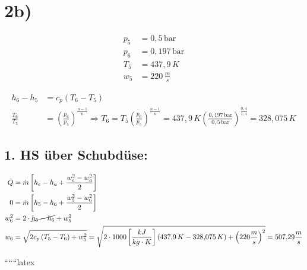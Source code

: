 

\section*{2b)}

\begin{align*}
    p_5 &= 0{,}5 \, \text{bar} \\
    p_6 &= 0{,}197 \, \text{bar} \\
    T_5 &= 437{,}9 \, K \\
    w_5 &= 220 \, \frac{m}{s}
\end{align*}

\begin{align*}
    h_6 - h_5 &= c_p \left( T_6 - T_5 \right) \\
    \frac{T_6}{T_5} &= \left( \frac{p_6}{p_5} \right)^{\frac{n-1}{n}} \Rightarrow T_6 = T_5 \left( \frac{p_6}{p_5} \right)^{\frac{n-1}{n}} = 437{,}9 \, K \left( \frac{0{,}197 \, \text{bar}}{0{,}5 \, \text{bar}} \right)^{\frac{0{,}4}{1{,}4}} = 328{,}075 \, K
\end{align*}

\subsection*{1. HS über Schubdüse:}

\begin{align*}
    \dot{Q} &= \dot{m} \left[ h_e - h_a + \frac{w_e^2 - w_a^2}{2} \right] \\
    0 &= \dot{m} \left[ h_5 - h_6 + \frac{w_5^2 - w_6^2}{2} \right] \\
    w_6^2 &= 2 \cdot \cancel{h_5 - h_6} + w_5^2 \\
    w_6 &= \sqrt{2 c_p \left( T_5 - T_6 \right) + w_5^2} = \sqrt{2 \cdot 1000 \left[ \frac{kJ}{kg \cdot K} \right] \left( 437{,}9 \, K - 328{,}075 \, K \right) + \left( 220 \frac{m}{s} \right)^2} = 507{,}29 \frac{m}{s}
\end{align*}

``````latex
